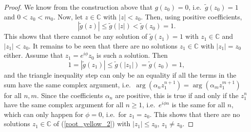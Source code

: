 \documentclass[12pt]{article}
\newcommand{\C}{\mathbb{C}} %
\newcommand{\1}{\mathds{1}}
\theoremstyle{definition}
\theoremstyle{plain}
\theoremstyle{remark}
\begin{document}
\begin{proof}
We know from the construction above that $g(z_0)=0$, i.e.\ $\tilde g(z_0)=1$ and $0<z_0<m_0$. Now, let $z\in\C$ with $|z|<z_0$. Then, using positive coefficients,
$$
|\tilde g(z)| \leq \tilde g(|z|) < \tilde g(z_0) = 1.
$$
This shows that there cannot be any solution of $\tilde g(z_1)=1$ with $z_1\in\C$ and $|z_1|<z_0$. It remains to be seen that there are no solutions $z_1\in\C$ with $|z_1|=z_0$ either. Assume that $z_1=e^{i\phi } z_0$ is such a solution. Then
$$
1=|\tilde g(z_1)| \leq \tilde g(|z_1|) = \tilde g(z_0) =1, 
$$
and the triangle inequality step can only be an equality if all the terms in the sum have the same complex argument, i.e.\ $\arg(\alpha_n z_1^{n+1})=\arg(\alpha_m z_1^{m+1})$ for all $n,m$. Since the coefficients $\alpha_n$ are positive, this is true if and only if the $z_1^n$ have the same complex argument for all $n\geq 1$, i.e.\ $e^{i\phi n}$ is the same for all $n$, which can only happen for $\phi=0$, i.e.\ for $z_1=z_0$. This shows that there are no solutions $z_1\in \C$ of  (\ref{root_yellow_2}) with $|z_1|\leq z_0$, $z_1\neq z_0$.
\end{proof}
\end{document}
